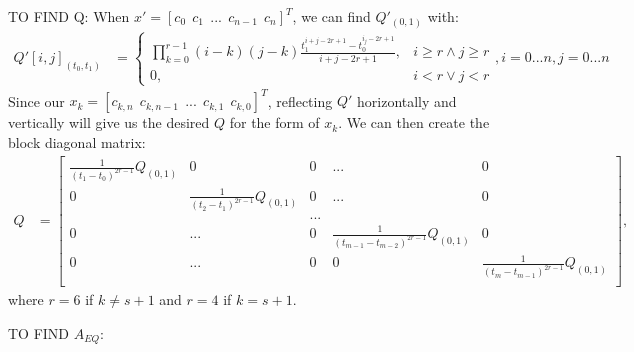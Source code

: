 \documentclass[11pt]{article}
\begin{document}
\mbox{} \newline
\mbox{} \newline
TO FIND Q: \newline
When $x' = [c_0 \ \ c_1 \ \ ... \ \ c_{n-1} \ \ c_n]^T$, we can find $Q'_{(0, 1)}$ with: 
\begin{align}
\label{eqn: Q}  Q'[i, j]_{(t_0, t_1)} &= 
\begin{cases}
    \prod_{k = 0}^{r-1} {(i-k)(j-k)} \frac{ t_1^{i+j-2r+1} - t_0^{i_j-2r+1} }{i+j-2r+1}, & i \ge r \land j \ge r \\
    0, & i < r \lor j < r 
\end{cases}, i = 0...n, j = 0...n
\end{align}
Since our $x_k = [c_{k, n} \ \ c_{k, n-1} \ \ ... \ \ c_{k, 1} \ \ c_{k, 0}]^T$, reflecting $Q'$ horizontally and vertically will give us the desired $Q$ for the form of $x_k$. We can then create the block diagonal matrix:
\begin{align}
\label{eqn: Qkeyframes} Q &= 
\begin{bmatrix}
  \frac{1}{(t_1-t_{0})^{2r-1}} Q_{(0, 1)} & 0 & 0 & ... & 0 \\
  0 & \frac{1}{(t_2-t_{1})^{2r-1}} Q_{(0, 1)} & 0 & ... & 0 \\
  & & ... & &  \\
  0 & ... & 0 & \frac{1}{(t_{m-1}-t_{m-2})^{2r-1}} Q_{(0, 1)} & 0 \\
  0 & ... & 0 & 0 & \frac{1}{(t_m-t_{m-1})^{2r-1}} Q_{(0, 1)} \\ 
 \end{bmatrix},
\end{align}
where $r = 6$ if $k \ne s+1$ and $r = 4$ if $k=s+1$. 



\mbox{} \newline
\mbox{} \newline
TO FIND $A_{EQ}$: \newline
\end{document}

